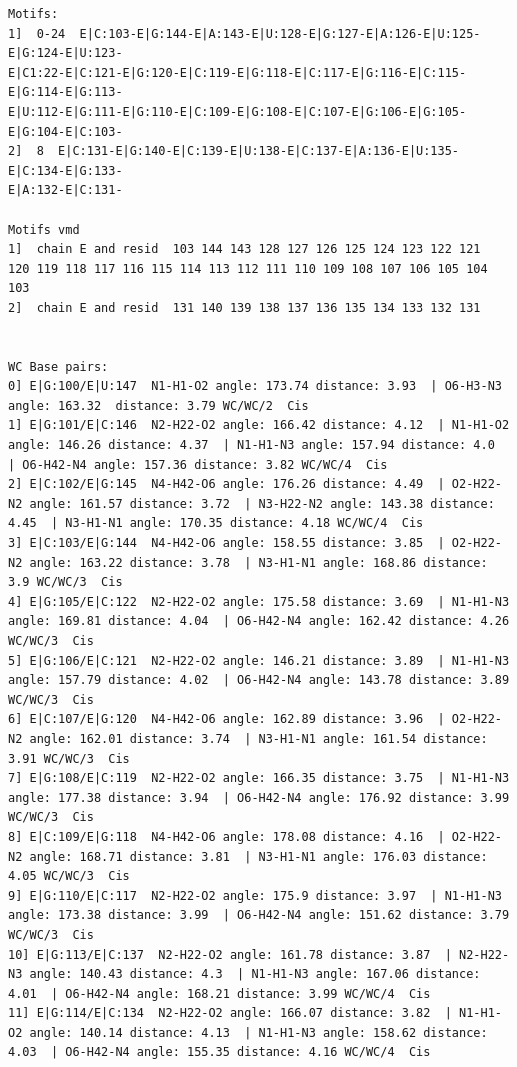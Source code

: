 \documentclass[12pt]{article}
\begin{document}
\begin{appendices}
\begin{scriptsize}
\begin{lstlisting}
Motifs:
1]  0-24  E|C:103-E|G:144-E|A:143-E|U:128-E|G:127-E|A:126-E|U:125-E|G:124-E|U:123-
E|C1:22-E|C:121-E|G:120-E|C:119-E|G:118-E|C:117-E|G:116-E|C:115-E|G:114-E|G:113-
E|U:112-E|G:111-E|G:110-E|C:109-E|G:108-E|C:107-E|G:106-E|G:105-E|G:104-E|C:103-
2]  8  E|C:131-E|G:140-E|C:139-E|U:138-E|C:137-E|A:136-E|U:135-E|C:134-E|G:133-
E|A:132-E|C:131-

Motifs vmd
1]  chain E and resid  103 144 143 128 127 126 125 124 123 122 121
120 119 118 117 116 115 114 113 112 111 110 109 108 107 106 105 104 103 
2]  chain E and resid  131 140 139 138 137 136 135 134 133 132 131 


WC Base pairs: 
0] E|G:100/E|U:147  N1-H1-O2 angle: 173.74 distance: 3.93  | O6-H3-N3 angle: 163.32  distance: 3.79 WC/WC/2  Cis
1] E|G:101/E|C:146  N2-H22-O2 angle: 166.42 distance: 4.12  | N1-H1-O2 angle: 146.26 distance: 4.37  | N1-H1-N3 angle: 157.94 distance: 4.0  | O6-H42-N4 angle: 157.36 distance: 3.82 WC/WC/4  Cis
2] E|C:102/E|G:145  N4-H42-O6 angle: 176.26 distance: 4.49  | O2-H22-N2 angle: 161.57 distance: 3.72  | N3-H22-N2 angle: 143.38 distance: 4.45  | N3-H1-N1 angle: 170.35 distance: 4.18 WC/WC/4  Cis
3] E|C:103/E|G:144  N4-H42-O6 angle: 158.55 distance: 3.85  | O2-H22-N2 angle: 163.22 distance: 3.78  | N3-H1-N1 angle: 168.86 distance: 3.9 WC/WC/3  Cis
4] E|G:105/E|C:122  N2-H22-O2 angle: 175.58 distance: 3.69  | N1-H1-N3 angle: 169.81 distance: 4.04  | O6-H42-N4 angle: 162.42 distance: 4.26 WC/WC/3  Cis
5] E|G:106/E|C:121  N2-H22-O2 angle: 146.21 distance: 3.89  | N1-H1-N3 angle: 157.79 distance: 4.02  | O6-H42-N4 angle: 143.78 distance: 3.89 WC/WC/3  Cis
6] E|C:107/E|G:120  N4-H42-O6 angle: 162.89 distance: 3.96  | O2-H22-N2 angle: 162.01 distance: 3.74  | N3-H1-N1 angle: 161.54 distance: 3.91 WC/WC/3  Cis
7] E|G:108/E|C:119  N2-H22-O2 angle: 166.35 distance: 3.75  | N1-H1-N3 angle: 177.38 distance: 3.94  | O6-H42-N4 angle: 176.92 distance: 3.99 WC/WC/3  Cis
8] E|C:109/E|G:118  N4-H42-O6 angle: 178.08 distance: 4.16  | O2-H22-N2 angle: 168.71 distance: 3.81  | N3-H1-N1 angle: 176.03 distance: 4.05 WC/WC/3  Cis
9] E|G:110/E|C:117  N2-H22-O2 angle: 175.9 distance: 3.97  | N1-H1-N3 angle: 173.38 distance: 3.99  | O6-H42-N4 angle: 151.62 distance: 3.79 WC/WC/3  Cis
10] E|G:113/E|C:137  N2-H22-O2 angle: 161.78 distance: 3.87  | N2-H22-N3 angle: 140.43 distance: 4.3  | N1-H1-N3 angle: 167.06 distance: 4.01  | O6-H42-N4 angle: 168.21 distance: 3.99 WC/WC/4  Cis
11] E|G:114/E|C:134  N2-H22-O2 angle: 166.07 distance: 3.82  | N1-H1-O2 angle: 140.14 distance: 4.13  | N1-H1-N3 angle: 158.62 distance: 4.03  | O6-H42-N4 angle: 155.35 distance: 4.16 WC/WC/4  Cis

\end{lstlisting}
\end{scriptsize}
\end{appendices}
\end{document}
